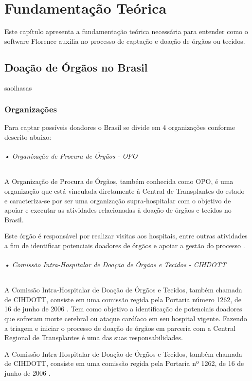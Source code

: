 \documentclass[portuguese,oneside]{tcc}
\begin{document}
\chapter{Fundamentação Teórica}
Este capítulo apresenta a fundamentação teórica necessária para entender como o software Florence auxilia no processo de captação e doação de órgãos ou tecidos.

\section{Doação de Órgãos no Brasil}
saoihasas

\subsection{Organizações}
Para captar possíveis doadores o Brasil se divide em 4 organizações conforme descrito abaixo:



\subparagraph{• Organização de Procura de Órgãos - OPO}

A Organização de Procura de Órgãos, também conhecida como OPO, é uma organização que está vinculada diretamente à Central de Transplantes do estado e caracteriza-se por ser uma organização supra-hospitalar com o objetivo de apoiar e executar as atividades relacionadas à doação de órgãos e tecidos no Brasil.

Este órgão é responsável por realizar visitas aos hospitais, entre outras atividades a fim de identificar potenciais doadores de órgãos e apoiar a gestão do processo \cite{HOSPITALSAOLUCAS}.   %

\subparagraph{• Comissão Intra-Hospitalar de Doação de Órgãos e Tecidos - CIHDOTT}

A Comissão Intra-Hospitalar de Doação de Órgãos e Tecidos, também chamada de CIHDOTT, consiste em uma comissão regida pela Portaria número 1262, de 16 de junho de 2006 \cite{HCI}. Tem como objetivo a identificação de potenciais doadores que sofreram morte cerebral ou ataque cardíaco em seu hospital vigente. Fazendo a triagem e iniciar o processo de doação de órgãos em parceria com a Central Regional de Transplantes é uma das suas responsabilidades.

A Comissão Intra-Hospitalar de Doação de Órgãos e Tecidos, também chamada de CIHDOTT, consiste em uma comissão regida pela Portaria nº 1262, de 16 de junho de 2006 \cite{HCI}.
\end{document}
